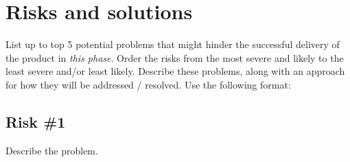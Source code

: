 \documentclass{article}
\begin{document}



 
   
     
\section{Risks and solutions}
   List up to top 5 potential problems that might hinder the successful delivery of the product in \textit{this phase}. 
   Order the risks from the most severe and likely to the least severe and/or least likely.
   Describe these problems, along with an approach for how they will be addressed / resolved.
   Use the following format:
   
   \subsection{Risk \#1}
   Describe the problem.
   
\end{document}
